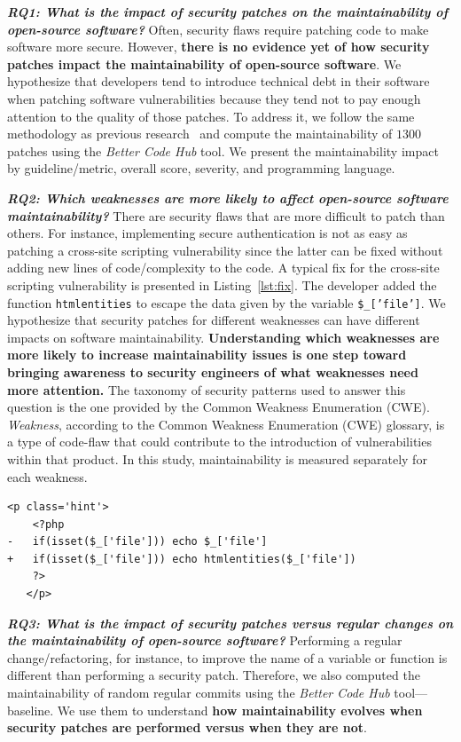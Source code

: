 \documentclass[smallextended]{svjour3}       %
\newcounter{lstannotation}
\begin{document}
\textit{\textbf{RQ1: What is the impact of security patches on the
maintainability of open-source software?}} Often, security flaws 
require patching code to make software more secure. However, 
\textbf{there is no evidence yet of how security patches impact the
maintainability of open-source software}. We hypothesize that 
developers tend to introduce technical debt in their software when 
patching software vulnerabilities because they tend not to pay enough 
attention to the quality of those patches. To address it, 
we follow the same methodology as previous research~\cite{8919169} and compute 
the maintainability of $1300$ patches using the \emph{Better Code Hub} tool. 
We present the maintainability impact by guideline/metric, overall score, 
severity, and programming language.

\textit{\textbf{RQ2: Which weaknesses are more likely to
affect open-source software maintainability?}} There are security 
flaws that are more difficult to patch than others. For instance, 
implementing secure authentication is not as easy as patching a
cross-site scripting vulnerability since the latter can be fixed
without adding new lines of code/complexity to the code. A typical 
fix for the cross-site scripting vulnerability is presented in 
Listing~\ref{lst:fix}. The developer added the function 
\texttt{htmlentities} to escape the data given by the variable
\texttt{\$\_['file']}. We hypothesize that security patches for 
different weaknesses can have different impacts on software maintainability. 
\textbf{Understanding which weaknesses are more likely to increase maintainability 
issues is one step toward bringing awareness to security engineers of what 
weaknesses need more attention.} The taxonomy of security patterns used to answer this 
question is the one provided by the Common Weakness Enumeration
(CWE). \emph{Weakness}, according to the Common Weakness Enumeration 
(CWE) glossary, is a type of code-flaw that could contribute to the 
introduction of vulnerabilities within that product. In this study, maintainability 
is measured separately for each weakness.
%
\setcounter{lstannotation}{0}
\begin{lstlisting}[style={PHPStyle}, caption={Fix provided by \texttt{nextcloud/server} developers to a Cross-Site Scripting vulnerability},label={lst:fix}]
   <p class='hint'>
    <?php
-   if(isset($_['file'])) echo $_['file']
+   if(isset($_['file'])) echo htmlentities($_['file'])
    ?>
   </p>
\end{lstlisting}
%
\textit{\textbf{RQ3: What is the impact of security patches versus 
regular changes on the maintainability of open-source software?}}
%
Performing a regular change/refactoring, for instance, to improve the name of 
a variable or function is different than performing a security patch.
Therefore, we also computed the maintainability of random regular commits using 
the \emph{Better Code Hub} tool---baseline. We use them to 
understand \textbf{how maintainability evolves when security patches 
are performed versus when they are not}.
%
\end{document}
